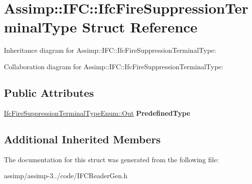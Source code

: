 \hypertarget{struct_assimp_1_1_i_f_c_1_1_ifc_fire_suppression_terminal_type}{\section{Assimp\+:\+:I\+F\+C\+:\+:Ifc\+Fire\+Suppression\+Terminal\+Type Struct Reference}
\label{struct_assimp_1_1_i_f_c_1_1_ifc_fire_suppression_terminal_type}
}


Inheritance diagram for Assimp\+:\+:I\+F\+C\+:\+:Ifc\+Fire\+Suppression\+Terminal\+Type\+:


Collaboration diagram for Assimp\+:\+:I\+F\+C\+:\+:Ifc\+Fire\+Suppression\+Terminal\+Type\+:
\subsection*{Public Attributes}
\begin{DoxyCompactItemize}
\item 
\hypertarget{struct_assimp_1_1_i_f_c_1_1_ifc_fire_suppression_terminal_type_a8f6a83c4c3754a824a00e59b58e86520}{\hyperlink{classboost_1_1shared__ptr}{Ifc\+Fire\+Suppression\+Terminal\+Type\+Enum\+::\+Out} {\bfseries Predefined\+Type}}\label{struct_assimp_1_1_i_f_c_1_1_ifc_fire_suppression_terminal_type_a8f6a83c4c3754a824a00e59b58e86520}

\end{DoxyCompactItemize}
\subsection*{Additional Inherited Members}


The documentation for this struct was generated from the following file\+:\begin{DoxyCompactItemize}
\item 
assimp/assimp-\/3../code/I\+F\+C\+Reader\+Gen.\+h\end{DoxyCompactItemize}
